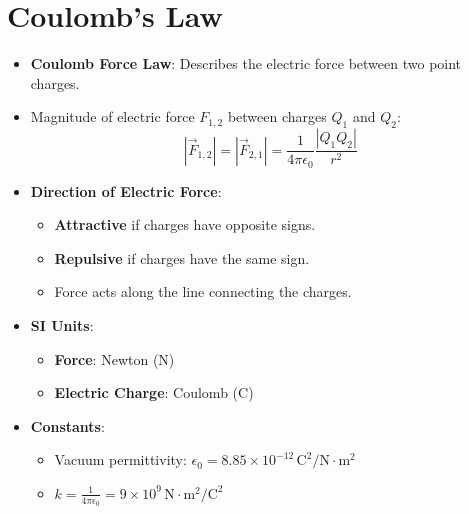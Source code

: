\documentclass{article}
\begin{document}
\section*{Coulomb's Law}
\begin{itemize}
    \item \textbf{Coulomb Force Law}: Describes the electric force between two point charges.
    \item Magnitude of electric force \( F_{1,2} \) between charges \( Q_1 \) and \( Q_2 \):
    \[
    |\vec{F}_{1,2}|= |\vec{F}_{2,1}| = \frac{1}{4 \pi \epsilon_0} \frac{|Q_1 Q_2|}{r^2}
    \]
    \item \textbf{Direction of Electric Force}:
    \begin{itemize}
        \item \textbf{Attractive} if charges have opposite signs.
        \item \textbf{Repulsive} if charges have the same sign.
        \item Force acts along the line connecting the charges.
    \end{itemize}
    \item \textbf{SI Units}:
    \begin{itemize}
        \item \textbf{Force}: Newton (N)
        \item \textbf{Electric Charge}: Coulomb (C)
    \end{itemize}
    \item \textbf{Constants}:
    \begin{itemize}
        \item Vacuum permittivity: \( \epsilon_0 = 8.85 \times 10^{-12} \, \text{C}^2/\text{N} \cdot \text{m}^2 \)
        \item \( k = \frac{1}{4 \pi \epsilon_0} = 9 \times 10^9 \, \text{N} \cdot \text{m}^2/\text{C}^2 \)
    \end{itemize}
\end{itemize}
\end{document}
